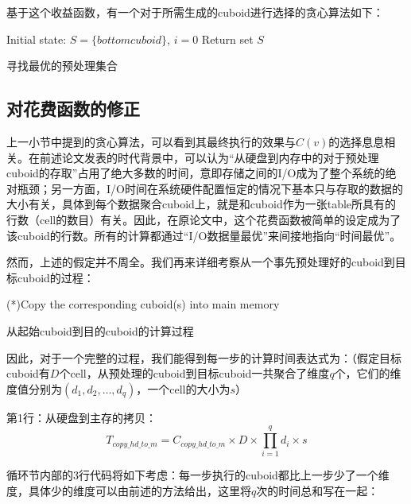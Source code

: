 基于这个收益函数，有一个对于所需生成的cuboid进行选择的贪心算法如下：
\begin{algorithm}[htbp]
\SetAlgoLined
{}
Initial state: $S = \{bottom cuboid\}$, $i = 0$\;
Return set $S$\;
\caption{寻找最优的预处理集合}
\label{algo:algorithm4}
\end{algorithm}

\subsection{对花费函数的修正}
上一小节中提到的贪心算法，可以看到其最终执行的效果与$C(v)$的选择息息相关。在前述论文发表的时代背景中，可以认为“从硬盘到内存中的对于预处理cuboid的存取”占用了绝大多数的时间，意即存储之间的I/O成为了整个系统的绝对瓶颈；另一方面，I/O时间在系统硬件配置恒定的情况下基本只与存取的数据的大小有关，具体到每个数据聚合cuboid上，就是和cuboid作为一张table所具有的行数（cell的数目）有关。因此，在原论文中，这个花费函数被简单的设定成为了该cuboid的行数。所有的计算都通过“I/O数据量最优”来间接地指向“时间最优”。

然而，上述的假定并不周全。我们再来详细考察从一个事先预处理好的cuboid到目标cuboid的过程：
\begin{algorithm}[htbp]
\SetAlgoLined
{}
(*)Copy the corresponding cuboid(s) into main memory\;
\caption{从起始cuboid到目的cuboid的计算过程}
\label{algo:algorithm5}
\end{algorithm}

因此，对于一个完整的过程，我们能得到每一步的计算时间表达式为：（假定目标cuboid有$D$个cell，从预处理的cuboid到目标cuboid一共聚合了维度$q$个，它们的维度值分别为$(d_1, d_2, …, d_q)$，一个cell的大小为$s$）

第1行：从硬盘到主存的拷贝：
\begin{equation}
T_{copy\_hd\_to\_m} = C_{copy\_hd\_to\_m} \times D \times \prod_{i = 1}^{q} d_i \times s
\end{equation}

循环节内部的3行代码将如下考虑：每一步执行的cuboid都比上一步少了一个维度，具体少的维度可以由前述的方法给出，这里将$q$次的时间总和写在一起：

